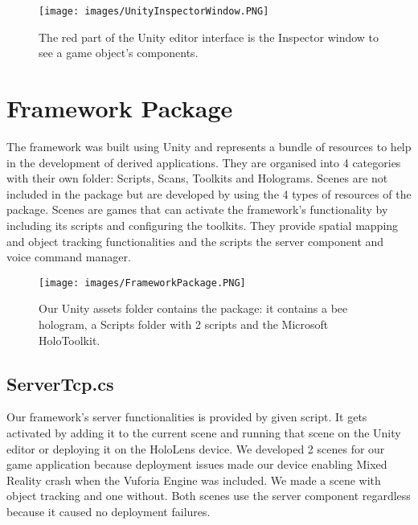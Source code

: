 \begin{figure}[!htb]
	\texttt{[image: images/UnityInspectorWindow.PNG]}
	\captionsetup{width=1.0\textwidth}
	\centering
	\caption{The red part of the Unity editor interface is the Inspector window to see a game object's components.} 
\end{figure}

\section{Framework Package}
The framework was built using Unity and represents a bundle of resources to help in the development of derived applications. They are organised into 4 categories with their own folder: Scripts, Scans, Toolkits and Holograms. Scenes are not included in the package but are developed by using the 4 types of resources of the package. Scenes are games that can activate the framework's functionality by including its scripts and configuring the toolkits. They provide spatial mapping and object tracking functionalities and the scripts the server component and voice command manager.

\begin{figure}[!htb]
	\texttt{[image: images/FrameworkPackage.PNG]}
	\captionsetup{width=1.0\textwidth}
	\centering
	\caption{Our Unity assets folder contains the package: it contains a bee hologram, a Scripts folder with 2 scripts and the Microsoft HoloToolkit.} 
\end{figure}

\subsection{ServerTcp.cs}
Our framework's server functionalities is provided by given script. It gets activated by adding it to the current scene and running that scene on the Unity editor or deploying it on the HoloLens device. We developed 2 scenes for our game application because deployment issues made our device enabling Mixed Reality crash when the Vuforia Engine was included. We made a scene with object tracking and one without. Both scenes use the server component regardless because it caused no deployment failures.



